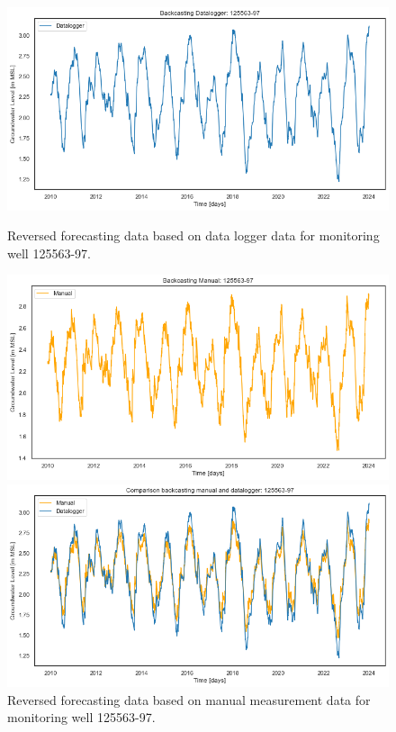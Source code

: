 \begin{figure}[htbp]
    \centering
    \begin{minipage}{0.32\textwidth}
        \centering
        \includegraphics[width=\linewidth]{frontmatter/Heijplaat-fig/Figure 2024-03-12 094846 (48).png}
        \caption{Reversed forecasting data based on data logger data for monitoring well 125563-97.}
        \label{dlheij}
    \end{minipage}
    \hfill
    \begin{minipage}{0.32\textwidth}
        \centering
        \includegraphics[width=\linewidth]{frontmatter/Heijplaat-fig/Figure 2024-03-12 094846 (62).png}
        \caption{Reversed forecasting data based on manual measurement data for monitoring well 125563-97.}
        \label{hpheij}
    \end{minipage}
    \hfill
    \begin{minipage}{0.32\textwidth}
        \centering
        \includegraphics[width=\linewidth]{frontmatter/Heijplaat-fig/Figure 2024-03-12 094846 (76).png}

\end{minipage}
\end{figure}
